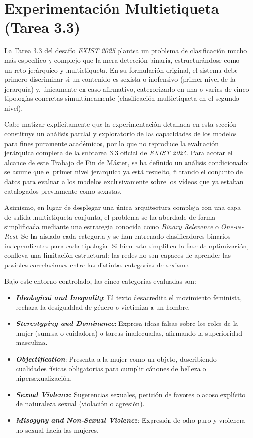 \section{Experimentación Multietiqueta (Tarea 3.3)}
\label{sec:ExperimentacionMultietiqueta}
La Tarea 3.3 del desafío \textit{EXIST 2025} plantea un problema de clasificación mucho más específico y complejo que la mera detección binaria, estructurándose como un reto jerárquico y multietiqueta. En su formulación original, el sistema debe primero discriminar si un contenido es sexista o inofensivo (primer nivel de la jerarquía) y, únicamente en caso afirmativo, categorizarlo en una o varias de cinco tipologías concretas simultáneamente (clasificación multietiqueta en el segundo nivel).

Cabe matizar explícitamente que la experimentación detallada en esta sección constituye un análisis parcial y exploratorio de las capacidades de los modelos para fines puramente académicos, por lo que no reproduce la evaluación jerárquica completa de la subtarea 3.3 oficial de \textit{EXIST 2025}. Para acotar el alcance de este Trabajo de Fin de Máster, se ha definido un análisis condicionado: se asume que el primer nivel jerárquico ya está resuelto, filtrando el conjunto de datos para evaluar a los modelos exclusivamente sobre los vídeos que ya estaban catalogados previamente como sexistas.

Asimismo, en lugar de desplegar una única arquitectura compleja con una capa de salida multietiqueta conjunta, el problema se ha abordado de forma simplificada mediante una estrategia conocida como \textit{Binary Relevance} o \textit{One-vs-Rest}. Se ha aislado cada categoría y se han entrenado clasificadores binarios independientes para cada tipología. Si bien esto simplifica la fase de optimización, conlleva una limitación estructural: las redes no son capaces de aprender las posibles correlaciones entre las distintas categorías de sexismo.

Bajo este entorno controlado, las cinco categorías evaluadas son:
\begin{itemize}
    \item \textbf{\textit{Ideological and Inequality}}: El texto desacredita el movimiento feminista, rechaza la desigualdad de género o victimiza a un hombre. 
    \item \textbf{\textit{Stereotyping and Dominance}}: Expresa ideas falsas sobre los roles de la mujer (sumisa o cuidadora) o tareas inadecuadas, afirmando la superioridad masculina. 
    \item \textbf{\textit{Objectification}}: Presenta a la mujer como un objeto, describiendo cualidades físicas obligatorias para cumplir cánones de belleza o hipersexualización.
    \item \textbf{\textit{Sexual Violence}}: Sugerencias sexuales, petición de favores o acoso explícito de naturaleza sexual (violación o agresión).
    \item \textbf{\textit{Misogyny and Non-Sexual Violence}}: Expresión de odio puro y violencia no sexual hacia las mujeres. 
\end{itemize}

